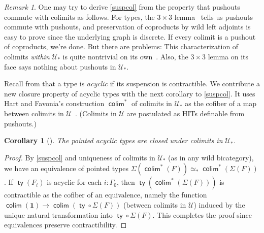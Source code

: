\documentclass[10pt,a4paper]{article}
\newtheorem{cor}[thm]{Corollary}
\theoremstyle{definition}
\theoremstyle{remark}
\newtheorem{rem}[thm]{Remark}
\newcommand{\U}{\mathcal{U}}
\newcommand{\0}{\mathbf{0}}
\newcommand{\1}{\mathbf{1}}
\newcommand{\2}{\mathbf{2}}
\DeclareMathOperator{\colimm}{\mathsf{colim}}
\DeclareMathOperator{\ty}{\mathsf{ty}}
\newcommand{\myhref}[2]{%
  \href{#1}{\textcolor{blue!30!black}{#2}}%
}
\begin{document}
\begin{rem}
One may try to derive \autoref{suspcol} from the property that pushouts commute with colimits as follows. For types, the $3\times 3$ lemma~\cite[Section VII]{3x3} tells us pushouts commute with pushouts, and preservation of coproducts by wild left adjoints is easy to prove since the underlying graph is discrete. If every colimit is a pushout of coproducts, we're done. But there are problems: This characterization of colimits \emph{within $\U_{\ast}$} is quite nontrivial on its own~\cite[Section 8.1]{CSL25}. Also, the $3\times 3$ lemma on its face says nothing about pushouts in $\U_{\ast}$.
\end{rem}

Recall from \cite{acyclic} that a type is \emph{acyclic} if its suspension is contractible. We contribute a new closure property of acyclic types with the next corollary to \autoref{suspcol}. It uses Hart and Favonia's construction $\colimm^{\ast}$ of colimits in $\U_{\ast}$ as the cofiber of a map between colimits in $\U$~\cite[Theorem 15]{CSL25}. (Colimits in $\U$ are postulated as HITs definable from pushouts.)
\begin{cor}[{\cite[\myhref{https://github.com/PHart3/colimits-agda/blob/lapc-lmcs/HoTT-Agda/theorems/homotopy/Acyc-colim.agda}{Acyc-colim}]{2cohagda-pub}}] 
The pointed acyclic types are closed under colimits in $\U_{\ast}$.
\end{cor}
\begin{proof}
By \autoref{suspcol} and uniqueness of colimits in $\U_{\ast}$ (as in any wild bicategory), we have an equivalence of pointed types $\Sigma(\colimm^{\ast}(F)) \simeq_{\ast} \colimm^{\ast}(\Sigma(F))$. If $\ty(F_i)$ is acyclic for each $i : \Gamma_0$, then $\ty(\colimm^{\ast}(\Sigma(F)))$ is contractible as the cofiber of an equivalence, namely the function $\colimm(\1) \to \colimm(\ty \circ \Sigma(F))$ (between colimits in $\U$) induced by the unique natural transformation into $\ty \circ \Sigma(F)$. This completes the proof since equivalences preserve contractibility.
\end{proof}
\end{document}

